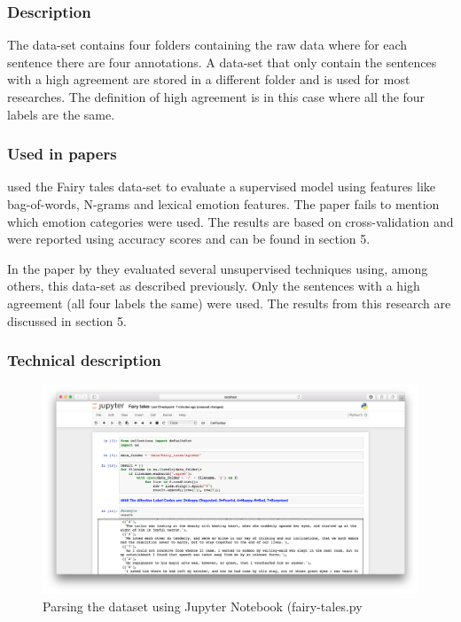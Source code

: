 \documentclass[
10pt, %
a4paper, %
oneside, %
headinclude,footinclude, %
BCOR5mm, %
]{scrartcl}
\begin{document}
\subsubsection{Description}
The data-set contains four folders containing the raw data where for each sentence there are four annotations. A data-set that only contain the sentences with a high agreement are stored in a different folder and is used for most researches. The definition of high agreement is in this case where all the four labels are the same.

 
\subsubsection{Used in papers}
\citeauthor{chaffar2011using} used the Fairy tales data-set to evaluate a supervised model using features like bag-of-words, N-grams and lexical emotion features. The paper fails to mention which emotion categories were used. The results are based on cross-validation and were reported using accuracy scores and can be found in section 5.

In the paper by \citep{kim2010evaluation} they evaluated several unsupervised techniques using, among others, this data-set as described previously. Only the sentences with a high agreement (all four labels the same) were used. The results from this research are discussed in section 5. 

\subsubsection{Technical description}
\begin{figure}[htb]
  \includegraphics[width=\linewidth]{dataset_fairy-tales.png}
  \caption{Parsing the dataset using Jupyter Notebook (fairy-tales.py}
  \label{fig:dataset_fairy-tales}
\end{figure}
\end{document}
